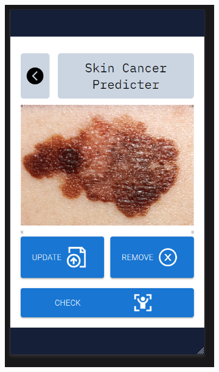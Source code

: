 \documentclass[]{final_report}
\begin{document}
\begin{figure}[ht!]
  \centering
  \begin{subfigure}{0.4\textwidth}
    \includegraphics[width=\linewidth]{images/UI-screenshot-unclear.png}
    \label{fig:Unclear-cropping}
  \end{subfigure}
  \begin{subfigure}{0.4\textwidth}

\end{subfigure}
\end{figure}
\end{document}
